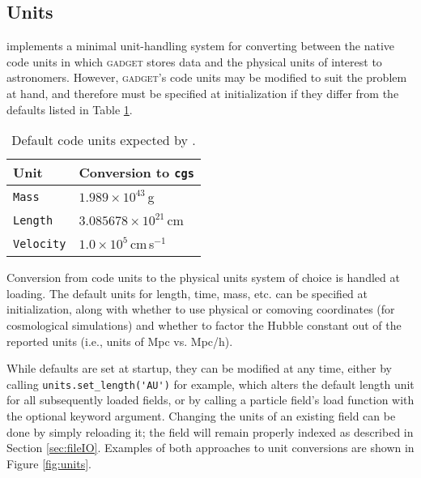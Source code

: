 \subsection{Units}
\label{sec:units}
 implements a minimal unit-handling system for converting between the native code units in which \textsc{gadget} stores data and the physical units of interest to astronomers.  
However, \textsc{gadget}'s code units may be modified to suit the problem at hand, and therefore must be specified at initialization if they differ from the defaults listed in Table \ref{code_unit_defaults}.
\begin{table}[h!]
    \centering
    \caption{Default code units expected by .}
    \label{code_unit_defaults}
    \begin{tabular}{ll}
        \hline
        Unit & Conversion to \verb|cgs|\\
        \hline
        \verb|Mass| &  $1.989\times10^{43}\,$g\\ 
        \verb|Length| & $3.085678\times10^{21}\,$cm \\ 
        \verb|Velocity| & $1.0\times10^5\,$cm$\,$s$^{-1}$ \\ 
    \end{tabular} 
\end{table}
Conversion from code units to the physical units system of choice is handled at loading.
The default units for length, time, mass, etc. can be specified at initialization, along with whether to use physical or comoving coordinates (for cosmological simulations) and whether to factor the Hubble constant out of the reported units (i.e., units of Mpc vs. Mpc/h).

While defaults are set at startup, they can be modified at any time, either by calling \verb|units.set_length('AU')| for example, which alters the default length unit for all subsequently loaded fields, or by calling a particle field's load function with the optional  keyword argument.  
Changing the units of an existing field can be done by simply reloading it; the field will remain properly indexed as described in Section \ref{sec:fileIO}. Examples of both approaches to unit conversions are shown in Figure \ref{fig:units}.